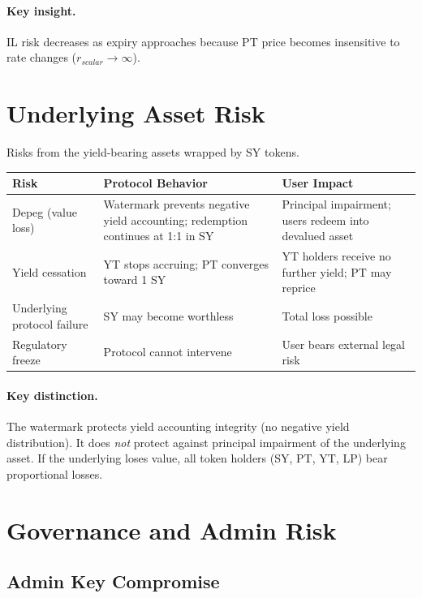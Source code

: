 \paragraph{Key insight.} IL risk decreases as expiry approaches because PT price becomes insensitive to rate changes ($r_{scalar} \to \infty$).

\section{Underlying Asset Risk}

Risks from the yield-bearing assets wrapped by SY tokens.

\begin{center}
\begin{tabularx}{\textwidth}{l >{\raggedright\arraybackslash}X >{\raggedright\arraybackslash}X}
\toprule
\textbf{Risk} & \textbf{Protocol Behavior} & \textbf{User Impact} \\
\midrule
Depeg (value loss) & Watermark prevents negative yield accounting; redemption continues at 1:1 in SY & Principal impairment; users redeem into devalued asset \\
Yield cessation & YT stops accruing; PT converges toward 1 SY & YT holders receive no further yield; PT may reprice \\
Underlying protocol failure & SY may become worthless & Total loss possible \\
Regulatory freeze & Protocol cannot intervene & User bears external legal risk \\
\bottomrule
\end{tabularx}
\end{center}

\paragraph{Key distinction.} The watermark protects yield accounting integrity (no negative yield distribution). It does \emph{not} protect against principal impairment of the underlying asset. If the underlying loses value, all token holders (SY, PT, YT, LP) bear proportional losses.

\section{Governance and Admin Risk}

\subsection{Admin Key Compromise}

